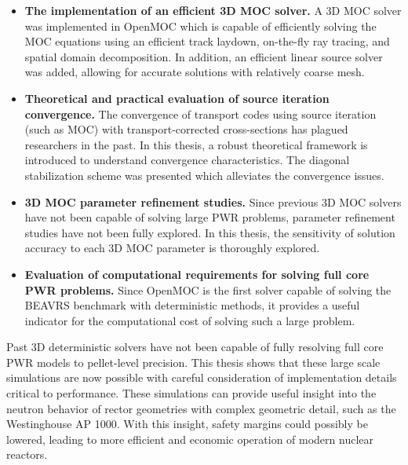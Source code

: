 \begin{emphbox}
\begin{itemize}
	
	\item \textbf{The implementation of an efficient 3D \ac{MOC} solver.} A 3D \ac{MOC} solver was implemented in OpenMOC which is capable of efficiently solving the \ac{MOC} equations using an efficient track laydown, on-the-fly ray tracing, and spatial domain decomposition. In addition, an efficient linear source solver was added, allowing for accurate solutions with relatively coarse mesh.
	
	\item \textbf{Theoretical and practical evaluation of source iteration convergence.} The convergence of transport codes using source iteration (such as MOC) with transport-corrected cross-sections has plagued researchers in the past. In this thesis, a robust theoretical framework is introduced to understand convergence characteristics. The diagonal stabilization scheme was presented which alleviates the convergence issues.
	
	\item \textbf{3D \ac{MOC} parameter refinement studies.} Since previous 3D \ac{MOC} solvers have not been capable of solving large \ac{PWR} problems, parameter refinement studies have not been fully explored. In this thesis, the sensitivity of solution accuracy to each 3D \ac{MOC} parameter is thoroughly explored.
	
	\item \textbf{Evaluation of computational requirements for solving full core \ac{PWR} problems.} Since OpenMOC is the first solver capable of solving the BEAVRS benchmark with deterministic methods, it provides a useful indicator for the computational cost of solving such a large problem.
	
\end{itemize}
\end{emphbox}

Past 3D deterministic solvers have not been capable of fully resolving full core \ac{PWR} models to pellet-level precision. This thesis shows that these large scale simulations are now possible with careful consideration of implementation details critical to performance. These simulations can provide useful insight into the neutron behavior of rector geometries with complex geometric detail, such as the Westinghouse AP 1000\texttrademark. With this insight, safety margins could possibly be lowered, leading to more efficient and economic operation of modern nuclear reactors.



